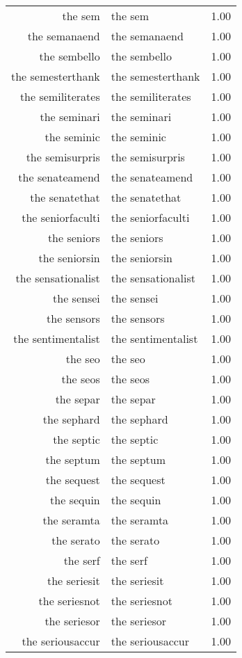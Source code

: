 \begin{table}[ht]
\begin{tabular}{rlr}
  the sem & the sem & 1.00 \\ 
  the semanaend & the semanaend & 1.00 \\ 
  the sembello & the sembello & 1.00 \\ 
  the semesterthank & the semesterthank & 1.00 \\ 
  the semiliterates & the semiliterates & 1.00 \\ 
  the seminari & the seminari & 1.00 \\ 
  the seminic & the seminic & 1.00 \\ 
  the semisurpris & the semisurpris & 1.00 \\ 
  the senateamend & the senateamend & 1.00 \\ 
  the senatethat & the senatethat & 1.00 \\ 
  the seniorfaculti & the seniorfaculti & 1.00 \\ 
  the seniors & the seniors & 1.00 \\ 
  the seniorsin & the seniorsin & 1.00 \\ 
  the sensationalist & the sensationalist & 1.00 \\ 
  the sensei & the sensei & 1.00 \\ 
  the sensors & the sensors & 1.00 \\ 
  the sentimentalist & the sentimentalist & 1.00 \\ 
  the seo & the seo & 1.00 \\ 
  the seos & the seos & 1.00 \\ 
  the separ & the separ & 1.00 \\ 
  the sephard & the sephard & 1.00 \\ 
  the septic & the septic & 1.00 \\ 
  the septum & the septum & 1.00 \\ 
  the sequest & the sequest & 1.00 \\ 
  the sequin & the sequin & 1.00 \\ 
  the seramta & the seramta & 1.00 \\ 
  the serato & the serato & 1.00 \\ 
  the serf & the serf & 1.00 \\ 
  the seriesit & the seriesit & 1.00 \\ 
  the seriesnot & the seriesnot & 1.00 \\ 
  the seriesor & the seriesor & 1.00 \\ 
  the seriousaccur & the seriousaccur & 1.00 \\ 

\end{tabular}
\end{table}
